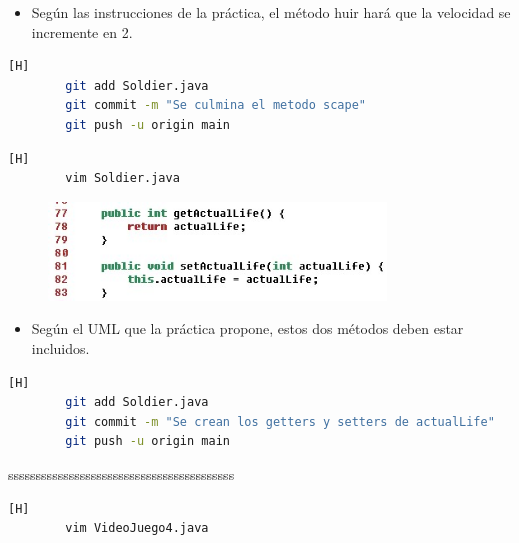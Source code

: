 \documentclass{article}
\begin{document}
	\begin{itemize}	
		\item Según las instrucciones de la práctica, el método huir hará que la velocidad se incremente en 2.
	\end{itemize}
	
	\begin{lstlisting}[language=bash,caption={Commit: 1da77b3ebe0b75aad7be43592fe92b96918a8ca1 }][H]
		git add Soldier.java
		git commit -m "Se culmina el metodo scape"			
		git push -u origin main
	\end{lstlisting}
	
	
	\begin{lstlisting}[language=bash,caption={Se crean los métodos accesores y mutadores de actualLife}][H]
		vim Soldier.java
	\end{lstlisting}
	
	\begin{figure}[H]
		\centering
		\includegraphics[width=0.8\textwidth,keepaspectratio]{img/actualLife.jpg}
	\end{figure}
	
	\begin{itemize}	
		\item Según el UML que la práctica propone, estos dos métodos deben estar incluidos.
	\end{itemize}
	
	\begin{lstlisting}[language=bash,caption={Commit: 7ea66af37c1857df332e648e8c1286347fb6cc4b }][H]
		git add Soldier.java
		git commit -m "Se crean los getters y setters de actualLife"			
		git push -u origin main
	\end{lstlisting}
	
	
	
	sssssssssssssssssssssssssssssssssssssssss
	
	\begin{lstlisting}[language=bash,caption={Se corrige el formato de impresión del tablero}][H]
		vim VideoJuego4.java
	\end{lstlisting}
	
\end{document}

